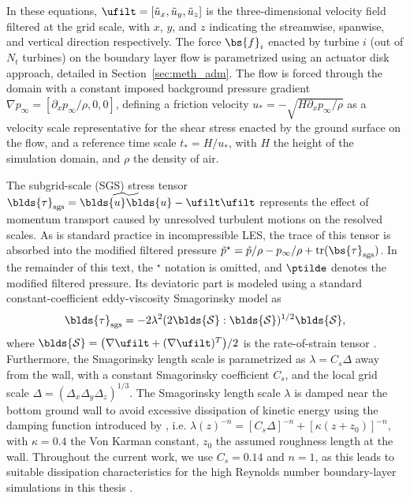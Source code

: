 In these equations, $\ufilt = [\tilde{u}_x, \tilde{u}_y, \tilde{u}_z]$ is the three-dimensional velocity field filtered at the grid scale, with $x$, $y$, and $z$ indicating the streamwise, spanwise, and vertical direction respectively. The force $\bs{f}_i$ enacted by turbine $i$ (out of $N_t$ turbines) on the boundary layer flow is parametrized using an actuator disk approach, detailed in Section~\ref{sec:meth_adm}. The flow is forced through the domain with a constant imposed background pressure gradient $\nabla p_\infty = [\partial_x p_\infty/\rho, 0, 0]$, defining a friction velocity $u_* = - \sqrt{H \partial_x p_\infty/\rho}$ as a velocity scale representative for the shear stress enacted by the ground surface on the flow, and a reference time scale $t_* = H/u_*$, with $H$ the height of the simulation domain, and $\rho$ the density of air. 

The subgrid-scale (SGS) stress tensor $\blds{\tau}_{\text{sgs}} = \widetilde{\blds{u} \blds{u}} - \ufilt \ufilt$ represents the effect of momentum transport caused by unresolved turbulent motions on the resolved scales. As is standard practice in incompressible LES, the trace of this tensor is absorbed into the modified filtered pressure $\tilde{p}^\star = \tilde{p}/\rho - p_\infty / \rho + \text{tr}(\bs{\tau}_\text{sgs})$. In the remainder of this text, the $^\star$ notation is omitted, and $\ptilde$ denotes the modified filtered pressure. Its deviatoric part is modeled using a standard constant-coefficient eddy-viscosity Smagorinsky model as 
\begin{equation}
	\blds{\tau}_{\text{sgs}} = - 2 \lambda^2 (2 \blds{\mathcal{S}} : \blds{\mathcal{S}})^{1/2} \blds{\mathcal{S}},
\end{equation}
where $\blds{\mathcal{S}} = \big(\nabla \ufilt + (\nabla \ufilt)^T \big)/2$ is the rate-of-strain tensor \citep{smagorinsky1963general}. Furthermore, the Smagorinsky length scale is parametrized as $\lambda = C_s \Delta$ away from the wall, with a constant Smagorinsky coefficient $C_s$, and the local grid scale $\Delta = (\Delta_x \Delta_y \Delta_z)^{1/3}$. The Smagorinsky length scale $\lambda$ is damped near the bottom ground wall to avoid excessive dissipation of kinetic energy using the damping function introduced by \cite{mason1992stochastic}, i.e. $\lambda(z)^{-n} = [C_s \Delta]^{-n} + [\kappa (z + z_0)]^{-n}$, with $\kappa = 0.4$ the Von Karman constant, $z_0$ the assumed roughness length at the wall. Throughout the current work, we use $C_s = 0.14$ and $n = 1$, as this leads to suitable dissipation characteristics for the high Reynolds number boundary-layer simulations in this thesis \citep{meyers2011error}.

